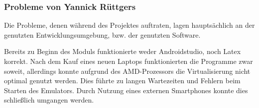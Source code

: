 \subsubsection{Probleme von Yannick Rüttgers}

Die Probleme, denen während des Projektes auftraten, lagen hauptsächlich an der genutzten Entwicklungsumgebung, bzw. der genutzten Software.

Bereits zu Beginn des Moduls funktionierte weder Androidstudio, noch Latex korrekt. Nach dem Kauf eines neuen Laptops funktionierten die Programme zwar soweit, allerdings konnte aufgrund des AMD-Prozessors die Virtualisierung nicht optimal genutzt werden. Dies führte zu langen Wartezeiten und Fehlern beim Starten des Emulators. Durch Nutzung eines externen Smartphones konnte dies schließlich umgangen werden.



